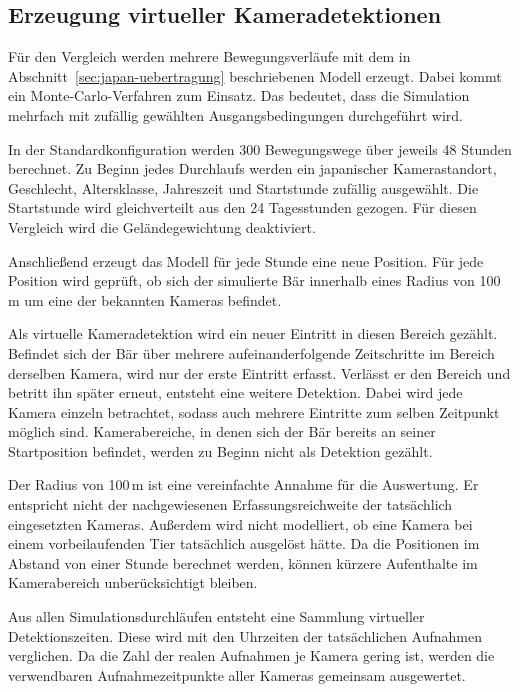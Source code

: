 \documentclass[12pt,a4paper]{report}
\begin{document}
\subsection{Erzeugung virtueller Kameradetektionen}
\label{subsec:monte-carlo}

Für den Vergleich werden mehrere Bewegungsverläufe mit
dem in Abschnitt~\ref{sec:japan-uebertragung}
beschriebenen Modell erzeugt. Dabei kommt ein
Monte-Carlo-Verfahren zum Einsatz. Das bedeutet,
dass die Simulation mehrfach mit zufällig gewählten
Ausgangsbedingungen durchgeführt wird.

In der Standardkonfiguration werden 300 Bewegungswege
über jeweils 48 Stunden berechnet. Zu Beginn jedes
Durchlaufs werden ein japanischer Kamerastandort,
Geschlecht, Altersklasse, Jahreszeit und Startstunde
zufällig ausgewählt. Die Startstunde wird gleichverteilt
aus den 24 Tagesstunden gezogen. Für diesen Vergleich
wird die Geländegewichtung deaktiviert.

Anschließend erzeugt das Modell für jede Stunde eine
neue Position. Für jede Position wird geprüft, ob sich
der simulierte Bär innerhalb eines Radius von 100\,m
um eine der bekannten Kameras befindet.

Als virtuelle Kameradetektion wird ein neuer Eintritt
in diesen Bereich gezählt. Befindet sich der Bär
über mehrere aufeinanderfolgende Zeitschritte im
Bereich derselben Kamera, wird nur der erste Eintritt
erfasst. Verlässt er den Bereich und betritt ihn
später erneut, entsteht eine weitere Detektion.
Dabei wird jede Kamera einzeln betrachtet, sodass
auch mehrere Eintritte zum selben Zeitpunkt möglich
sind. Kamerabereiche, in denen sich der Bär bereits
an seiner Startposition befindet, werden zu Beginn
nicht als Detektion gezählt.

Der Radius von 100\,m ist eine vereinfachte
Annahme für die Auswertung. Er entspricht nicht
der nachgewiesenen Erfassungsreichweite der
tatsächlich eingesetzten Kameras. Außerdem wird
nicht modelliert, ob eine Kamera bei einem
vorbeilaufenden Tier tatsächlich ausgelöst hätte.
Da die Positionen im Abstand von einer Stunde
berechnet werden, können kürzere Aufenthalte
im Kamerabereich unberücksichtigt bleiben.

Aus allen Simulationsdurchläufen entsteht eine
Sammlung virtueller Detektionszeiten. Diese wird
mit den Uhrzeiten der tatsächlichen Aufnahmen
verglichen. Da die Zahl der realen Aufnahmen je
Kamera gering ist, werden die verwendbaren
Aufnahmezeitpunkte aller Kameras gemeinsam
ausgewertet.
\end{document}
